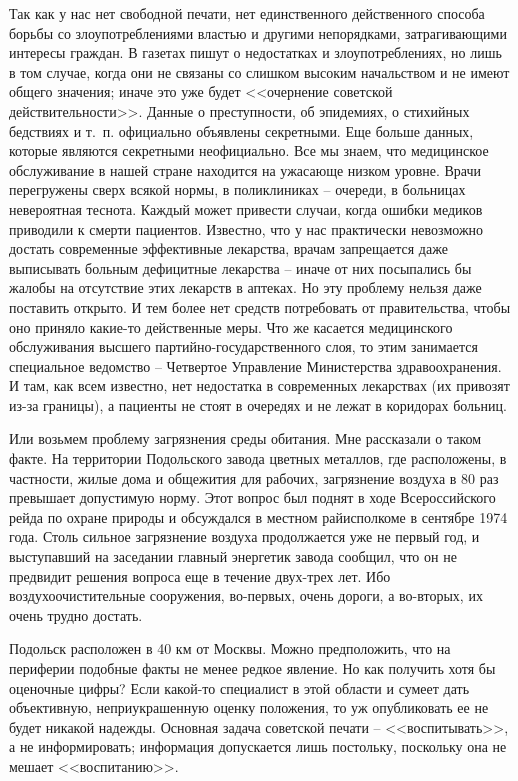 \documentclass{book}
\begin{document}
Так как у нас нет свободной печати, нет единственного действенного способа борьбы со злоупотреблениями властью и другими 
непорядками, затрагивающими интересы граждан. В газетах пишут о недостатках и злоупотреблениях, но лишь в том случае, когда они 
не связаны со слишком высоким начальством и не имеют общего значения; иначе это уже будет <<очернение советской 
действительности>>. Данные о преступности, об эпидемиях, о стихийных бедствиях и т.~п. официально объявлены секретными. Еще 
больше данных, которые являются секретными неофициально. Все мы знаем, что медицинское обслуживание в нашей стране находится на 
ужасающе низком уровне. Врачи перегружены сверх всякой нормы, в поликлиниках -- очереди, в больницах невероятная теснота. Каждый 
может привести случаи, когда ошибки медиков приводили к смерти пациентов. Известно, что у нас практически невозможно достать 
современные эффективные лекарства, врачам запрещается даже выписывать больным дефицитные лекарства -- иначе от них посыпались бы 
жалобы на отсутствие этих лекарств в аптеках. Но эту проблему нельзя даже поставить открыто. И тем более нет средств потребовать 
от правительства, чтобы оно приняло какие-то действенные меры. Что же касается медицинского обслуживания высшего 
партийно-государственного слоя, то этим занимается специальное ведомство -- Четвертое Управление Министерства здравоохранения. И 
там, как всем известно, нет недостатка в современных лекарствах (их при­возят из-за границы), а пациенты не стоят в очередях и не 
лежат в коридорах больниц.

Или возьмем проблему загрязнения среды обитания. Мне рассказали о таком факте. На территории Подольского завода цветных 
металлов, где расположены, в частности, жилые дома и общежития для рабочих, загрязнение воздуха в 80 раз превышает допустимую 
норму. Этот вопрос был поднят в ходе Всероссийского рейда по охране природы и обсуждался в местном райисполкоме в сентябре 1974 
года. Столь сильное загрязнение воздуха продолжается уже не первый год, и выступавший на заседании главный энергетик завода 
сообщил, что он не предвидит решения вопроса еще в течение двух-трех лет. Ибо воздухоочистительные сооружения, во-первых, очень 
дороги, а во-вторых, их очень трудно достать.

Подольск расположен в 40 км от Москвы. Можно предположить, что на периферии подобные факты не менее редкое явление. Но как 
получить хотя бы оценочные цифры? Если какой-то специалист в этой области и сумеет дать объективную, неприукрашенную оценку 
положения, то уж опубликовать ее не будет никакой надежды. Основная задача советской печати -- <<воспитывать>>, а не 
информировать; информация допускает­ся лишь постольку, поскольку она не мешает <<воспитанию>>.
\end{document}
